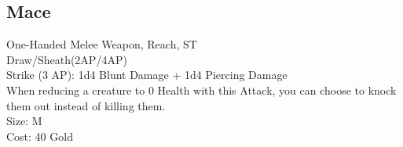 \subsection{Mace}\label{weapon:mace}
One-Handed Melee Weapon,  Reach, ST\\
Draw/Sheath(2AP/4AP)\\
Strike (3 AP): 1d4 Blunt Damage + 1d4 Piercing Damage\\
When reducing a creature to 0 Health with this Attack, you can choose to knock them out instead of killing them.\\
Size: M\\
Cost: 40 Gold\\